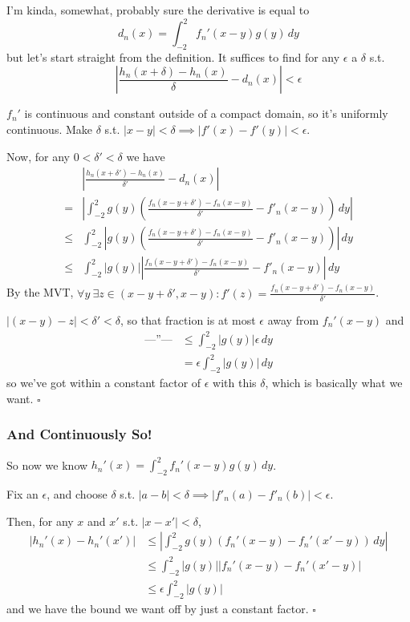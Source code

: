 \documentclass[12pt]{article}
\newcommand*{\ditto}{---''---}
\begin{document}
I'm kinda, somewhat, probably sure the derivative is equal to
\[d_n(x)=\int_{-2}^{2} f_n'(x-y)g(y)\,dy\]
but let's start straight from the definition.
It suffices to find for any $\epsilon$ a $\delta$ s.t.
\[\left|\frac{h_n(x+\delta)-h_n(x)}{\delta}-d_n(x)\right| < \epsilon\]

$f_n'$ is continuous and constant outside of a compact domain, so it's uniformly continuous.
Make $\delta$ s.t. $|x-y| < \delta \implies |f'(x)-f'(y)| <\epsilon$.

Now, for any $0 < \delta' < \delta$ we have
\begin{align*}
        & \left|\frac{h_n(x+\delta')-h_n(x)}{\delta'}-d_n(x)\right|                                           \\
  ={}   & \left|\int_{-2}^{2} g(y)\left(\frac{f_n(x-y+\delta')-f_n(x-y)}{\delta'}-f'_n(x-y)\right)\,dy\right| \\
  \le{} & \int_{-2}^{2} \left|g(y)\left(\frac{f_n(x-y+\delta')-f_n(x-y)}{\delta'}-f'_n(x-y)\right)\right|\,dy \\
  \le{} & \int_{-2}^{2} |g(y)|\left|\frac{f_n(x-y+\delta')-f_n(x-y)}{\delta'}-f'_n(x-y)\right|\,dy
\end{align*}
By the MVT, $\forall y\ \exists z \in (x-y+\delta', x-y): f'(z)=\frac{f_n(x-y+\delta')-f_n(x-y)}{\delta'}$.

$|(x-y)-z| < \delta' < \delta$, so that fraction is at most $\epsilon$ away from $f_n'(x-y)$ and
\begin{align*}
  \text{\ditto}
   & \le \int_{-2}^{2} |g(y)|\epsilon\,dy \\
   & = \epsilon \int_{-2}^{2} |g(y)|\,dy
\end{align*}
so we've got within a constant factor of $\epsilon$ with this $\delta$,
which is basically what we want. $\square$

\pagebreak

\subsubsection{And Continuously So!}

So now we know $h_n'(x)=\int_{-2}^{2} f_n'(x-y)g(y)\,dy$.

Fix an $\epsilon$, and choose $\delta$ s.t. $|a-b| < \delta \implies |f'_n(a)-f'_n(b)| < \epsilon$.

Then, for any $x$ and $x'$ s.t. $|x-x'| < \delta$,
\begin{align*}
  |h_n'(x)-h_n'(x')|
   & \le \left|\int_{-2}^{2} g(y)(f_n'(x-y)-f_n'(x'-y))\,dy\right| \\
   & \le \int_{-2}^{2} |g(y)||f_n'(x-y)-f_n'(x'-y)|                \\
   & \le \epsilon \int_{-2}^{2} |g(y)|
\end{align*}
and we have the bound we want off by just a constant factor. $\square$
\end{document}
